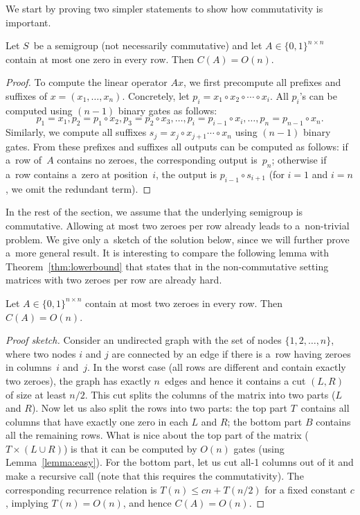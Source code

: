 \documentclass[review,onefignum,onetabnum]{siamart190516}
\begin{document}
\matrixmultcor*

We start by proving two simpler statements to show how commutativity is
important.

\begin{lemma}\label{lemma:easy}
Let $S$~be a semigroup (not necessarily commutative) and let
$A \in \{0,1\}^{n \times n}$ contain at most
one zero in every row. Then
$C(A) = O(n)$.
\end{lemma}

\begin{proof}
To compute the linear operator $Ax$, we first
precompute all prefixes and suffixes of $x=(x_1, \dotsc, x_n)$.
Concretely, let $p_i=x_1 \circ x_2 \circ \dotsb \circ x_i$. All $p_i$'s can be
computed using $(n-1)$ binary gates as follows:
\[
p_1=x_1, p_2=p_1 \circ x_2, p_3=p_2 \circ x_3, \dotsc, p_i=p_{i-1} \circ x_i, \dotsc, p_n=p_{n-1}\circ x_n.
\]
Similarly, we compute all suffixes
$s_j=x_j \circ x_{j+1} \dotsb \circ x_n$ using
$(n-1)$ binary gates. From these prefixes and suffixes
all outputs can be
computed as follows: if a~row of~$A$ contains no zeroes,
the corresponding
output is~$p_n$; otherwise if a~row contains a~zero at position~$i$, the
output is $p_{i-1} \circ s_{i+1}$ (for $i=1$ and $i=n$, we omit the redundant
term).
\end{proof}

In the rest of the section, we assume that the
underlying semigroup is
commutative. Allowing at most two zeroes per row already leads to a~non-trivial
problem. We give only a~sketch of the solution below, since we will further
prove a~more general result. It is interesting to compare the following lemma
with Theorem~\ref{thm:lowerbound} that states that in the
non-commutative setting matrices with two zeroes per row are already hard.

\begin{lemma} \label{lem:at_most_2}
Let $A \in \{0,1\}^{n \times n}$ contain at most two zeroes in every row. Then
$C(A) = O(n)$.
\end{lemma}
\begin{proof}[Proof sketch]
Consider an undirected graph with the set of nodes $\{1,2,\dotsc,n\}$, where
two nodes $i$ and $j$ are connected by an edge if there is a~row having zeroes
in columns~$i$ and~$j$. In the worst case (all rows are different and contain
exactly two zeroes), the graph has exactly $n$~edges and hence it contains a cut
$(L,R)$ of size at least $n/2$. This cut splits the columns of the matrix into
two parts ($L$ and $R$). Now let us also split the rows into two parts: the top
part $T$~contains all columns that have exactly one zero in each $L$ and $R$;
the bottom part $B$ contains all the remaining rows. What is nice about the top
part of the matrix ($T \times (L \cup R)$) is that it can be computed by $O(n)$
gates (using Lemma~\ref{lemma:easy}). For the bottom part, let us cut all-1
columns out of it and make a recursive call (note that this requires the
commutativity). The corresponding recurrence relation is $T(n) \le cn + T(n/2)$
for a fixed constant $c$, implying $T(n)=O(n)$, and hence $C(A) = O(n)$.
\end{proof}
\end{document}

